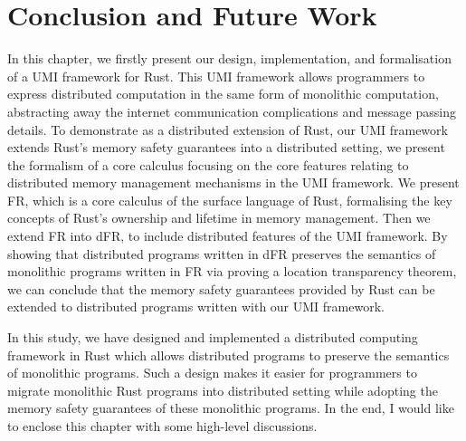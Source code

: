 
\section{Conclusion and Future Work}
\label{chap3:conclusion}
In this chapter, we firstly present our design, implementation, and formalisation of a UMI framework for Rust. This UMI framework allows programmers to express distributed computation in the same form of monolithic computation, abstracting away the internet communication complications and message passing details. To demonstrate as a distributed extension of Rust, our UMI framework extends Rust's memory safety guarantees into a distributed setting, we present the formalism of a core calculus focusing on the core features relating to distributed memory management mechanisms in the UMI framework. We present FR, which is a core calculus of the surface language of Rust, formalising the key concepts of Rust's ownership and lifetime in memory management. Then we extend FR into dFR, to include distributed features of the UMI framework. By showing that distributed programs written in dFR preserves the semantics of monolithic programs written in FR via proving a location transparency theorem, we can conclude that the memory safety guarantees provided by Rust can be extended to distributed programs written with our UMI framework.

\noindent
\begin{center}
\vspace{0.3em}
\vspace{-0.7em}
\end{center}
In this study, we have designed and implemented a distributed computing framework in Rust which allows distributed programs to preserve the semantics of monolithic programs. Such a design makes it easier for programmers to migrate monolithic Rust programs into distributed setting while adopting the memory safety guarantees of these monolithic programs. In the end, I would like to enclose this chapter with some high-level discussions.

